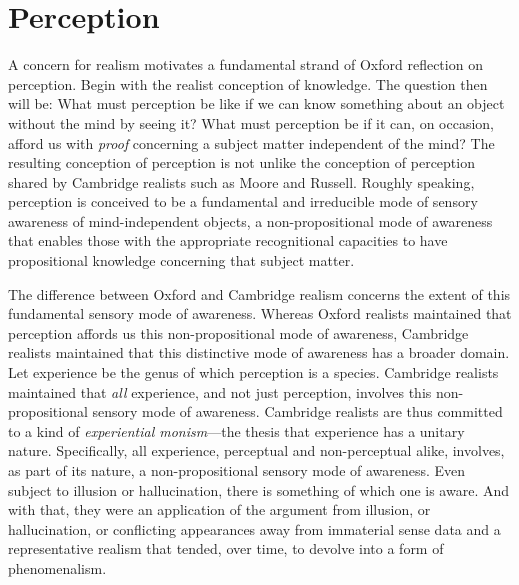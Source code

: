 \documentclass[11pt]{article}
\title{\mytitle}
\author{\myauthor}
\begin{document}
\maketitle

\setlength{\parindent}{1em}


% 
% 
% 

\section{Perception} %
\label{sec:perception}

A concern for realism motivates a fundamental strand of Oxford reflection on perception. Begin with the realist conception of knowledge.  The question then will be: What must perception be like if we can know something about an object without the mind by seeing it? What must perception be if it can, on occasion, afford us with \emph{proof} concerning a subject matter independent of the mind? The resulting conception of perception is not unlike the conception of perception shared by Cambridge realists such as Moore and Russell. Roughly speaking, perception is conceived to be a fundamental and irreducible mode of sensory awareness of mind-independent objects, a non-propositional mode of awareness that enables those with the appropriate recognitional capacities to have propositional knowledge concerning that subject matter. 

The difference between Oxford and Cambridge realism concerns the extent of this fundamental sensory mode of awareness. Whereas Oxford realists maintained that perception affords us this non-propositional mode of awareness, Cambridge realists maintained that this distinctive mode of awareness has a broader domain. Let experience be the genus of which perception is a species. Cambridge realists maintained that \emph{all} experience, and not just perception, involves this non-propositional sensory mode of awareness. Cambridge realists are thus committed to a kind of \emph{experiential monism}---the thesis that experience has a unitary nature. Specifically, all experience, perceptual and non-perceptual alike, involves, as part of its nature, a non-propositional sensory mode of awareness. Even subject to illusion or hallucination, there is something of which one is aware. And with that, they were an application of the argument from illusion, or hallucination, or conflicting appearances away from immaterial sense data and a representative realism that tended, over time, to devolve into a form of phenomenalism.
\end{document}
